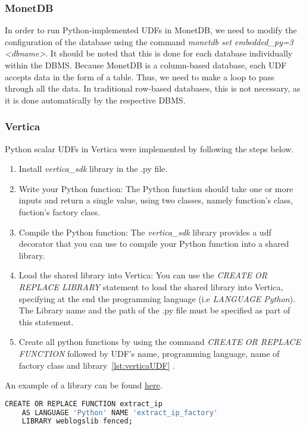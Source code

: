 \subsubsection{MonetDB}
In order to run Python-implemented UDFs in MonetDB, we need to modify the 
configuration of the database using the command 
\emph{monetdb set embedded\_py=3 <dbname>}. 
It should be noted that this is done for each database individually within
the DBMS. Because MonetDB is a column-based database, each UDF accepts data
in the form of a table. 
Thus, we need to make a loop to pass through all the data. In traditional
row-based databases, this is not necessary, as it is done automatically by the respective DBMS.


\subsubsection{Vertica}
Python scalar UDFs in Vertica were implemented by following the steps below. 
\begin{enumerate}
	\item Install \emph{vertica\_sdk} library in the .py file.
	\item Write your Python function: The Python function should take 
	one or more inputs and return a single value, using two classes, namely
	function's class, fuction's factory class.
	\item Compile the Python function: The \emph{vertica\_sdk} library provides 
	a udf decorator that you can use to compile your Python function into a shared library.
	\item Load the shared library into Vertica: You can use the 
	\emph{CREATE OR REPLACE LIBRARY} statement to load the shared library into Vertica, 
	specifying at the end the programming language (i.e \emph{LANGUAGE Python}).
	The Library name and the path of the .py file must be specified as part of this statement.
	\item Create all python functions by using the command \emph{CREATE OR REPLACE FUNCTION}
	followed by UDF's name, programming language, name of factory class and library~\ref{lst:verticaUDF} .
\end{enumerate}
An example of a library can be found 
\href{https://www.vertica.com/docs/9.2.x/HTML/Content/Authoring/ExtendingVertica/UDx/ScalarFunctions/Python/PythonExampleAdd2Ints.htm}{here}.
\begin{lstlisting}[language=sh, caption={Example of UDF in Vertica},label={lst:verticaUDF}] 
	CREATE OR REPLACE FUNCTION extract_ip 
	AS LANGUAGE 'Python' NAME 'extract_ip_factory' 
	LIBRARY weblogslib fenced;
\end{lstlisting}

